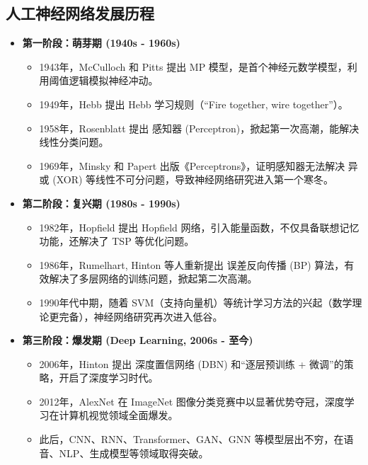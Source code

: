 \documentclass[a4paper, 11pt]{ctexart}
\begin{document}
\subsection{人工神经网络发展历程}
\begin{itemize}
    \item \textbf{第一阶段：萌芽期 (1940s - 1960s)}
    \begin{itemize}
        \item 1943年，McCulloch 和 Pitts 提出 MP 模型，是首个神经元数学模型，利用阈值逻辑模拟神经冲动。
        \item 1949年，Hebb 提出 Hebb 学习规则（“Fire together, wire together”）。
        \item 1958年，Rosenblatt 提出 感知器 (Perceptron)，掀起第一次高潮，能解决线性分类问题。
        \item 1969年，Minsky 和 Papert 出版《Perceptrons》，证明感知器无法解决 异或 (XOR) 等线性不可分问题，导致神经网络研究进入第一个寒冬。
    \end{itemize}
    \item \textbf{第二阶段：复兴期 (1980s - 1990s)}
    \begin{itemize}
        \item 1982年，Hopfield 提出 Hopfield 网络，引入能量函数，不仅具备联想记忆功能，还解决了 TSP 等优化问题。
        \item 1986年，Rumelhart, Hinton 等人重新提出 误差反向传播 (BP) 算法，有效解决了多层网络的训练问题，掀起第二次高潮。
        \item 1990年代中期，随着 SVM（支持向量机）等统计学习方法的兴起（数学理论更完备），神经网络研究再次进入低谷。
    \end{itemize}
    \item \textbf{第三阶段：爆发期 (Deep Learning, 2006s - 至今)}
    \begin{itemize}
        \item 2006年，Hinton 提出 深度置信网络 (DBN) 和“逐层预训练 + 微调”的策略，开启了深度学习时代。
        \item 2012年，AlexNet 在 ImageNet 图像分类竞赛中以显著优势夺冠，深度学习在计算机视觉领域全面爆发。
        \item 此后，CNN、RNN、Transformer、GAN、GNN 等模型层出不穷，在语音、NLP、生成模型等领域取得突破。
    \end{itemize}
\end{itemize}
\end{document}
